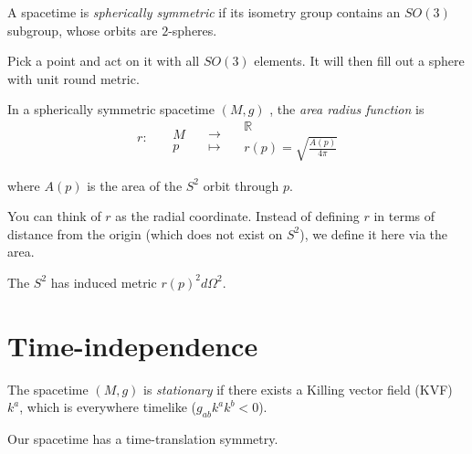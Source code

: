 \begin{definition}[]
  A spacetime is \emph{spherically symmetric} if its isometry group contains an $SO(3)$ subgroup, whose orbits are $2$-spheres.
\end{definition}
\begin{leftbar}
  Pick a point and act on it with all $SO(3)$ elements. It will then fill out a sphere with unit round metric.
\end{leftbar}
\begin{definition}[]
  In a spherically symmetric spacetime $(M, g)$ , the \emph{area radius function} is 
  \begin{equation}
    \begin{gathered}
      r \colon \\
      \qquad
    \end{gathered}
    \begin{gathered}
      M \\
      p
    \end{gathered}
    \quad
    \begin{gathered}
      \to \\
      \mapsto
    \end{gathered}
    \quad
    \begin{gathered}
      \mathbb{R} \\
      r(p) = \sqrt{\frac{A(p)}{4 \pi}}
    \end{gathered}
  \end{equation}
\end{definition}
where $A(p)$  is the area of the $S^2$  orbit through $p$. 
\begin{leftbar}
  You can think of $r$ as the radial coordinate. Instead of defining $r$ in terms of distance from the origin (which does not exist on $S^2$), we define it here via the area.
\end{leftbar}
\begin{remark}
  The $S^2$ has induced metric $r(p)^2 d\Omega^2$.
\end{remark}

\section{Time-independence}%
\label{sec:time_independence}

\begin{definition}[stationary]
  \label{def:stationary}
  The spacetime $(M, g)$ is \emph{stationary} if there exists a Killing vector field (KVF) $k^{a}$, which is everywhere timelike ($g_{ab} k^{a} k^{b} < 0$).
\end{definition}
\begin{leftbar}
  Our spacetime has a time-translation symmetry.
\end{leftbar}


